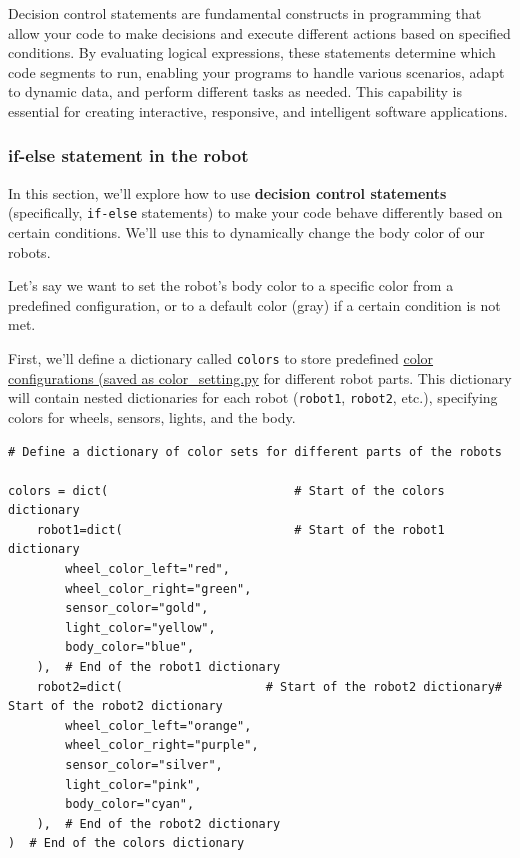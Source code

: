 Decision control statements are fundamental constructs in programming that allow your code to make decisions and execute different actions based on specified conditions. By evaluating logical expressions, these statements determine which code segments to run, enabling your programs to handle various scenarios, adapt to dynamic data, and perform different tasks as needed. This capability is essential for creating interactive, responsive, and intelligent software applications.

\subsubsection{if-else statement in the robot}
In this section, we'll explore how to use \textbf{decision control statements} (specifically, \texttt{if-else} statements) to make your code behave differently based on certain conditions. We'll use this to dynamically change the body color of our robots.

Let's say we want to set the robot's body color to a specific color from a predefined configuration, or to a default color (gray) if a certain condition is not met.

First, we'll define a dictionary called \texttt{colors} to store predefined \href{https://github.com/balandongiv/computer_programming_gist/blob/main/session3/color_setting.py}{color configurations (saved as color\_setting.py} for different robot parts. This dictionary will contain nested dictionaries for each robot (\texttt{robot1}, \texttt{robot2}, etc.), specifying colors for wheels, sensors, lights, and the body.




\begin{verbatim}
# Define a dictionary of color sets for different parts of the robots

colors = dict(                          # Start of the colors dictionary
    robot1=dict(                        # Start of the robot1 dictionary
        wheel_color_left="red",
        wheel_color_right="green",
        sensor_color="gold",
        light_color="yellow",
        body_color="blue",
    ),  # End of the robot1 dictionary
    robot2=dict(                    # Start of the robot2 dictionary# Start of the robot2 dictionary
        wheel_color_left="orange",
        wheel_color_right="purple",
        sensor_color="silver",
        light_color="pink",
        body_color="cyan",
    ),  # End of the robot2 dictionary
)  # End of the colors dictionary
\end{verbatim}

